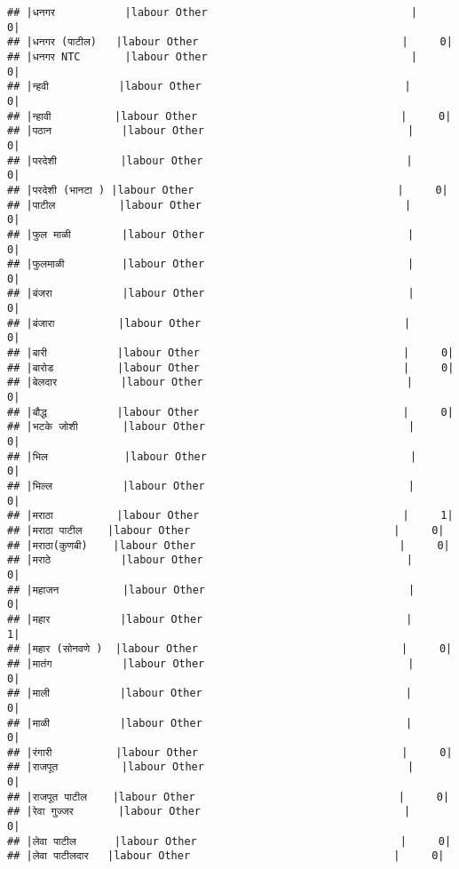 \documentclass[
]{article}
\begin{document}
\begin{verbatim}
## |धनगर           |labour Other                                |     0|
## |धनगर (पाटील)   |labour Other                                |     0|
## |धनगर NTC       |labour Other                                |     0|
## |न्हवी           |labour Other                                |     0|
## |न्हावी          |labour Other                                |     0|
## |पठान           |labour Other                                |     0|
## |परदेशी          |labour Other                                |     0|
## |परदेशी (भानटा ) |labour Other                                |     0|
## |पाटील          |labour Other                                |     0|
## |फुल माळी        |labour Other                                |     0|
## |फुलमाळी         |labour Other                                |     0|
## |बंजरा           |labour Other                                |     0|
## |बंजारा          |labour Other                                |     0|
## |बारी           |labour Other                                |     0|
## |बारोड          |labour Other                                |     0|
## |बेलदार          |labour Other                                |     0|
## |बौद्ध           |labour Other                                |     0|
## |भटके जोशी       |labour Other                                |     0|
## |भिल            |labour Other                                |     0|
## |भिल्ल           |labour Other                                |     0|
## |मराठा          |labour Other                                |     1|
## |मराठा पाटील    |labour Other                                |     0|
## |मराठा(कुणबी)    |labour Other                                |     0|
## |मराठे           |labour Other                                |     0|
## |महाजन          |labour Other                                |     0|
## |महार           |labour Other                                |     1|
## |महार (सोनवणे )  |labour Other                                |     0|
## |मातंग           |labour Other                                |     0|
## |माली           |labour Other                                |     0|
## |माळी           |labour Other                                |     0|
## |रंगारी          |labour Other                                |     0|
## |राजपूत          |labour Other                                |     0|
## |राजपूत पाटील    |labour Other                                |     0|
## |रेवा गुज्जर       |labour Other                                |     0|
## |लेवा पाटील      |labour Other                                |     0|
## |लेवा पाटीलदार   |labour Other                                |     0|

\end{verbatim}
\end{document}
